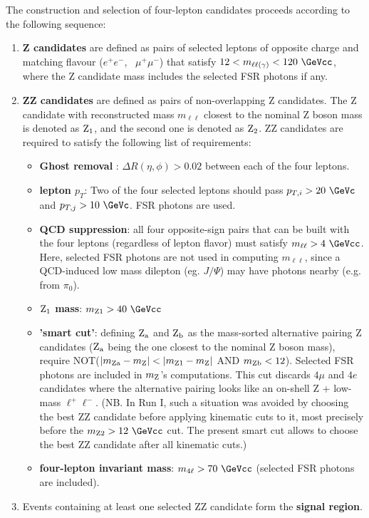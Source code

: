 The construction and selection of four-lepton candidates proceeds 
according to the following sequence:
\begin{enumerate}
\item {\bf Z candidates} are defined as pairs of selected leptons
 of opposite charge and matching flavour ($e^+ e^-$, \, $\mu^+\mu^-$)
 that satisfy $12 < m_{\ell\ell(\gamma)} < 120~\GeVcc$, where the Z candidate mass
 includes the selected FSR photons if any.
\item {\bf ZZ candidates} are defined as pairs of non-overlapping Z candidates.
 The Z candidate with reconstructed mass $m_{\ell\ell}$ closest to the nominal Z boson
 mass is denoted as ${\rm Z_1}$, and the second one is denoted as ${\rm Z_2}$.
 ZZ candidates are required to satisfy the following list of requirements:
  \begin{itemize} 
  \item {\bf Ghost removal }: $\Delta R(\eta,\phi) > 0.02$ between each of the four leptons.
  \item {\bf lepton $p_T$}: Two of the four selected leptons should pass 
     $p_{T,i} > 20~\GeVc$ and $p_{T,j} > 10~\GeVc$. FSR photons are used. 
  \item {\bf QCD suppression}: all four opposite-sign pairs that can
     be built with the four leptons (regardless of lepton flavor)
     must satisfy $m_{\ell\ell} > 4~\GeVcc$.
     Here, selected FSR photons are not used in computing $m_{\ell\ell}$, 
     since a QCD-induced low mass dilepton (eg. $J/\Psi$) 
     may have photons nearby (e.g. from $\pi_0$). 
  \item {\bf ${\rm Z_1}$ mass}: $m_{\rm Z1} > 40~\GeVcc$
  \item {\bf 'smart cut'}: defining ${\rm Z_a}$ and ${\rm Z_b}$ as 
     the mass-sorted alternative pairing Z candidates 
     (${\rm Z_a}$ being the one closest to the nominal Z boson mass),
     require NOT($|m_{\rm Za}-m_{\rm Z}| < |m_{\rm Z1}-m_{\rm Z}|$ AND $m_{\rm Zb}<12$).
     Selected FSR photons are included in $m_{\rm Z}$'s computations.
     This cut discards $4\mu$ and $4e$ candidates where the alternative pairing
     looks like an on-shell Z + low-mass $\ell^+ \ell^-$. 
     (NB. In Run I, such a situation was avoided by choosing the best ZZ candidate
     before applying kinematic cuts to it, most precisely before the $m_{\rm Z2} > 12~\GeVcc$ cut.
     The present smart cut allows to choose the best ZZ candidate after all kinematic cuts.)   
  \item {\bf four-lepton invariant mass}: $\mllll > 70~\GeVcc$ (selected FSR photons are included).
  \end{itemize}	
\item Events containing at least one selected ZZ candidate form the {\bf signal region}.
\end{enumerate}	


